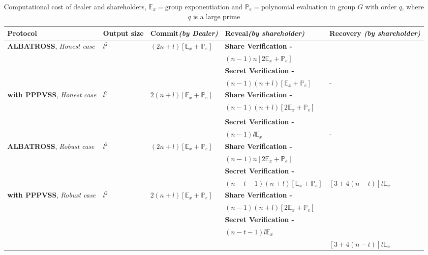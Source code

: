 \begin{table}[H]
\centering
\begin{tabular}{|p{3cm}|p{1.2cm}|p{2.5cm}|p{5.5cm}|p{2.5cm}|}
\hline
\textbf{Protocol}    & \textbf{Output size}    & 
\textbf{Commit}\textit{(by Dealer)} & \textbf{Reveal}\textit{(by 
shareholder)} & \textbf{Recovery} \textit{(by shareholder)}                                                           
\\ \hline
\textbf{ALBATROSS}, \textit{Honest case}    & $l^2$ & 
$(2n+l)[\mathbb{E}_x+\mathbb{P}_e]$ & \textbf{Share Verification - }  &  
\\
& & & $(n-1)n[2\mathbb{E}_x+\mathbb{P}_e]$ & \\
& & & \textbf{Secret Verification - } & \\ 
& & & $(n-1)(n+l)[\mathbb{E}_x+\mathbb{P}_e]$&- \\ \hline
\textbf{with PPPVSS}, \textit{Honest case}    & $l^2$  & 
$2(n+l)[\mathbb{E}_x+\mathbb{P}_e]$ & \textbf{Share Verification - } &  \\ 
& & & $(n-1)(n+l)[2\mathbb{E}_x+\mathbb{P}_e]$ &  \\ 
& & & &  \\
& & & \textbf{Secret Verification - } & \\ 
& & & $(n-1)l\mathbb{E}_x$ & -  \\ \hline
\textbf{ALBATROSS}, \textit{Robust case}    & $l^2$ & 
$(2n+l)[\mathbb{E}_x+\mathbb{P}_e]$ & \textbf{Share Verification - }  &  
\\
& & & $(n-1)n[2\mathbb{E}_x+\mathbb{P}_e]$ & \\
& & & \textbf{Secret Verification - } & \\ 
& & & $(n-t-1)(n+l)[\mathbb{E}_x+\mathbb{P}_e]$& 
$[3+4(n-t)]t\mathbb{E}_{x}$\\ \hline
\textbf{with PPPVSS}, \textit{Robust case}    & $l^2$  & 
$2(n+l)[\mathbb{E}_x+\mathbb{P}_e]$ & \textbf{Share Verification - } &  \\ 
& & & $(n-1)(n+l)[2\mathbb{E}_x+\mathbb{P}_e]$ &  \\
& & & \textbf{Secret Verification - } & \\ 
& & & $(n-t-1)l\mathbb{E}_x$ &   \\
& & & & $[3+4(n-t)]t\mathbb{E}_{x}$  \\ \hline

\end{tabular}
\caption{Computational cost of dealer and shareholders, 
$\mathbb{E}_x=$group exponentiation and $\mathbb{P}_e=$polynomial 
evaluation in group $G$ with order $q$, where $q$ is a large prime}
\label{tab:comp_alba_pppvss_no group mul}
\end{table}

